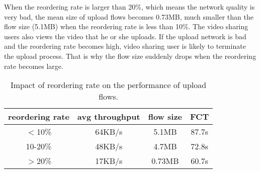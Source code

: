 

When the reordering rate is larger than 20\%, which means the network quality is very bad, the mean size of upload flows becomes 0.73MB, much smaller than the flow size (5.1MB) when the reordering rate is less than 10\%. The video sharing users also views the video that he or she uploads. If the upload network is bad and the reordering rate becomes high, video sharing user is likely to terminate the upload process. That is why the flow size suddenly drops when the reordering rate becomes large. 

\begin{table}[ht]
\tablefontsize
\renewcommand{\arraystretch}{\assize}
 \setlength{\tabcolsep}{3pt}
\caption{Impact of reordering rate on the performance of upload flows.}
\centering
\begin{tabular}{c|c|c|c}
	\toprule
	reordering rate & avg throughput & flow size & FCT \\
	\hline
	$<$10\% & 64KB/s & 5.1MB & 87.7s \\
	\hline
	10-20\% & 48KB/s & 4.7MB & 72.8s \\
	\hline
	$>$20\% & 17KB/s & 0.73MB & 60.7s \\
	\bottomrule
\end{tabular}
\label{tbl:reorder-rate-influence}
\termspace
\end{table}  

